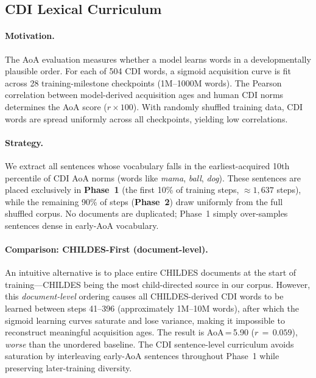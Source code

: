 \documentclass[11pt]{article}
\begin{document}
\subsection{CDI Lexical Curriculum}
\label{sec:curriculum}

\paragraph{Motivation.}
The AoA evaluation measures whether a model learns words in
a developmentally plausible order.
For each of 504 CDI words, a sigmoid acquisition curve is fit
across 28 training-milestone checkpoints (1M--1000M words).
The Pearson correlation between model-derived acquisition ages and
human CDI norms determines the AoA score ($r \times 100$).
With randomly shuffled training data, CDI words are spread uniformly
across all checkpoints, yielding low correlations.

\paragraph{Strategy.}
We extract all sentences whose vocabulary falls in the
earliest-acquired 10th percentile of CDI AoA norms
(words like \emph{mama}, \emph{ball}, \emph{dog}).
These sentences are placed exclusively in \textbf{Phase~1}
(the first 10\% of training steps, ${\approx}1{,}637$ steps),
while the remaining 90\% of steps (\textbf{Phase~2}) draw uniformly
from the full shuffled corpus.
No documents are duplicated; Phase~1 simply over-samples
sentences dense in early-AoA vocabulary.

\paragraph{Comparison: CHILDES-First (document-level).}
An intuitive alternative is to place entire CHILDES documents
at the start of training---CHILDES being the most child-directed
source in our corpus.
However, this \emph{document-level} ordering causes
all CHILDES-derived CDI words to be learned between steps 41--396
(approximately 1M--10M words),
after which the sigmoid learning curves saturate and lose variance,
making it impossible to reconstruct meaningful acquisition ages.
The result is AoA\,=\,5.90 ($r\,{=}\,0.059$),
\emph{worse} than the unordered baseline.
The CDI sentence-level curriculum avoids saturation by
interleaving early-AoA sentences throughout Phase~1
while preserving later-training diversity.

\end{document}
